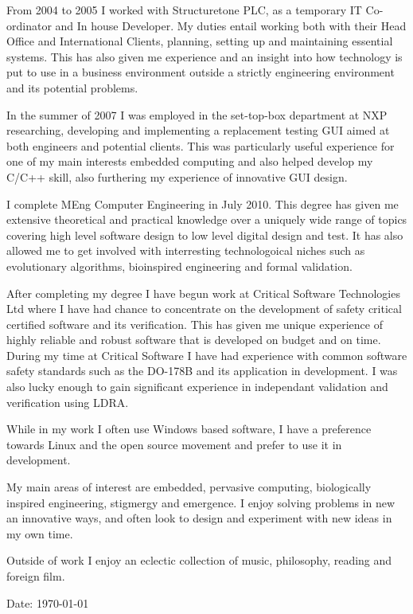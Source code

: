 \documentclass[overlapped,line,letterpaper]{res}
\begin{document}
\begin{resume}
From 2004 to 2005 I worked with Structuretone PLC, as a temporary IT 
Co-ordinator and In house Developer. 
My duties entail working both with their Head Office and International Clients, 
planning, setting up and maintaining essential systems. 
This has also given me experience and an insight into how technology is put to 
use in a business environment outside a strictly engineering environment and its
potential problems. 

In the summer of 2007 I was employed in the set-top-box department at NXP 
researching, developing and implementing a replacement testing GUI aimed at both
engineers and potential clients. 
This was particularly useful experience for one of my main interests embedded 
computing and also helped develop my C/C++ skill, also furthering my experience 
of innovative GUI design.

I complete MEng Computer Engineering in July 2010. 
This degree has given me extensive theoretical and practical knowledge over a 
uniquely wide range of topics covering high level software design to low level 
digital design and test. 
It has also allowed me to get involved with interresting technologoical niches 
such as evolutionary algorithms, bioinspired engineering and formal validation.

After completing my degree I have begun work at Critical Software Technologies 
Ltd where I have had chance to concentrate on the development of safety critical
certified software and its verification. 
This has given me unique experience of highly reliable and robust software that
is developed on budget and on time. 
During my time at Critical Software I have had experience with common software
safety standards such as the DO-178B and its application in development. 
I was also lucky enough to gain significant experience in independant validation
and verification using LDRA. 

While in my work I often use Windows based software, I have a preference towards
Linux and the open source movement and prefer to use it in development.

My main areas of interest are embedded, pervasive computing, biologically 
inspired engineering, stigmergy and emergence. 
I enjoy solving problems in new an innovative ways, and often look to design and
experiment with new ideas in my own time.

Outside of work I enjoy an eclectic collection of music, philosophy, reading and
foreign film. 


\begin{center}
{\tiny \rm $ $Date: \today $ $ }
\end{center}

\end{resume}
\end{document}
